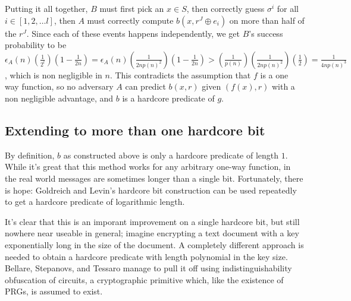 Putting it all together, \(B\) must first pick an \(x \in S\), then
correctly guess \(\sigma^i\) for all \(i \in [1, 2, \dots l]\), then
\(A\) must correctly compute \(b(x, r^J \oplus e_i)\) on more than half
of the \(r^J\). Since each of these events happens independently, we get
\(B\)'s success probability to be
\(\epsilon_A(n) (\tfrac{1}{2^l})(1 - \tfrac{1}{2n}) = \epsilon_A(n) (\tfrac{1}{2n p(n)^2}) ( 1 - \tfrac{1}{2n}) > (\tfrac{1}{p(n)})(\tfrac{1}{2np(n)^2})(\tfrac{1}{2}) = \tfrac{1}{4n p(n)^3}\),
which is non negligible in \(n\). This contradicts the assumption that
\(f\) is a one way function, so no adversary \(A\) can predict
\(b(x, r)\) given \((f(x), r)\) with a non negligible advantage, and
\(b\) is a hardcore predicate of \(g\).

\subsection{Extending to more than one hardcore
bit}\label{11-Extending-to-more-than}

By definition, \(b\) as constructed above is only a hardcore predicate
of length \(1\). While it's great that this method works for any
arbitrary one-way function, in the real world messages are sometimes
longer than a single bit. Fortunately, there is hope: Goldreich and
Levin's hardcore bit construction can be used repeatedly to get a
hardcore predicate of logarithmic length.

\hypertarget{LogHCBthm}{}

It's clear that this is an imporant improvement on a single hardcore
bit, but still nowhere near useable in general; imagine encrypting a
text document with a key exponentially long in the size of the document.
A completely different approach is needed to obtain a hardcore predicate
with length polynomial in the key size. Bellare, Stepanovs, and Tessaro
manage to pull it off using indistinguishability obfuscation of
circuits, a cryptographic primitive which, like the existence of PRGs,
is assumed to exist.


